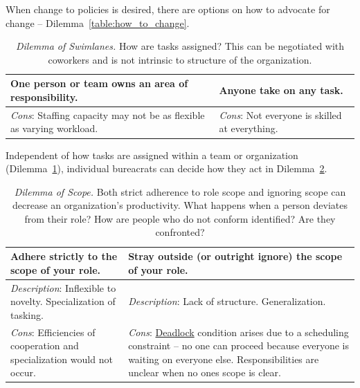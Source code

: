 When change to policies is desired, there are options on how to advocate for change -- Dilemma~\ref{table:how_to_change}.

\begin{center}
\begin{table}[H] %
\begin{tabular}{ | m{\dilemmatablewidth}| m{\dilemmatablewidth} | } 
  \hline
  \textbf{One person or team owns an area of responsibility.} & 
  \textbf{Anyone take on any task.} \\ 
  \hline
  \textit{Cons}: Staffing capacity may not be as flexible as varying workload. & 
  \textit{Cons}: Not everyone is skilled at everything. \\  
  \hline
\end{tabular}
\caption{\textit{Dilemma of Swimlanes.} How are tasks assigned? This can be negotiated with coworkers and is not intrinsic to structure of the organization. 
}
\label{table:swimlanes}
\end{table}
\end{center}


Independent of how tasks are assigned within a team or organization (Dilemma~\ref{table:swimlanes}), individual bureacrats can decide how they act in Dilemma~\ref{table:scope_of_activity}.


\begin{center}
\begin{table}[H] %
\begin{tabular}{ | m{\dilemmatablewidth}| m{\dilemmatablewidth} | } 
  \hline
  \textbf{Adhere strictly to the scope of your role.} & 
  \textbf{Stray outside (or outright ignore) the scope of your role.} \\ 
  \hline
  \textit{Description}: Inflexible to novelty. Specialization of tasking. & 
  \textit{Description}: Lack of structure. Generalization. \\ 
  \hline
  \textit{Cons}: Efficiencies of cooperation and specialization would not occur. & 
  \textit{Cons}: \href{https://en.wikipedia.org/wiki/Deadlock}{Deadlock} condition arises due to a scheduling constraint -- no one can proceed because everyone is waiting on everyone else. Responsibilities are unclear when no ones scope is clear. \\  
  \hline
\end{tabular}
\caption{\textit{Dilemma of Scope.}
Both strict adherence to role scope and ignoring scope can decrease an organization's productivity. 
What happens when a person deviates from their role?
How are people who do not conform identified? Are they confronted?
}
\label{table:scope_of_activity}
\end{table}
\end{center}

